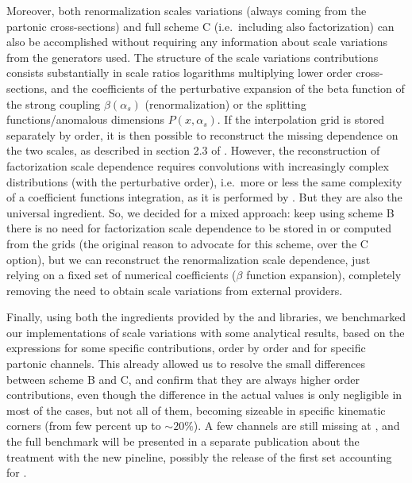 Moreover, both renormalization scales variations (always coming from the
partonic cross-sections) and full scheme C (i.e.\ including also factorization)
can also be accomplished without requiring any information about scale
variations from the generators used.
The structure of the scale variations contributions consists substantially in
scale ratios logarithms multiplying lower order cross-sections, and the
coefficients of the perturbative expansion of the beta function of the strong
coupling $\beta(\alpha_s)$ (renormalization) or the splitting
functions/anomalous dimensions $P(x, \alpha_s)$.
%
If the interpolation grid is stored separately by order, it is then possible to
reconstruct the missing dependence on the two scales, as described in section
2.3 of \cite{Carli:2010rw}.
%
However, the reconstruction of factorization scale dependence requires
convolutions with increasingly complex distributions (with the perturbative
order), i.e.\ more or less the same complexity of a \dis coefficient functions
integration, as it is performed by \yadism.
But they are also the universal ingredient.
%
So, we decided for a mixed approach: keep using scheme B there is no need for
factorization scale dependence to be stored in or computed from the grids (the
original reason to advocate for this scheme, over the C option), but we can
reconstruct the renormalization scale dependence, just relying on a fixed set
of numerical coefficients ($\beta$ function expansion), completely removing the
need to obtain scale variations from external providers.

Finally, using both the ingredients provided by the \eko and \yadism libraries,
we benchmarked our implementations of scale variations with some analytical
results, based on the expressions for some specific \dis contributions, order
by order and for specific partonic channels.
%
This already allowed us to resolve the small differences between scheme B and
C, and confirm that they are always higher order contributions, even though the
difference in the actual values is only negligible in most of the cases, but
not all of them, becoming sizeable in specific kinematic corners (from few
percent up to $\sim 20\%$).
%
A few channels are still missing at \nnlo, and the full benchmark will be
presented in a separate publication about the \mhou treatment with the new
pineline, possibly the release of the first \nnlo \nnpdf set accounting for
\mhou.
